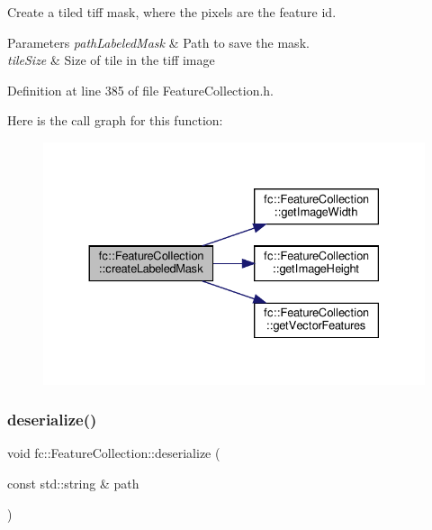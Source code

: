Create a tiled tiff mask, where the pixels are the feature id. 


\begin{DoxyParams}{Parameters}
{\em path\+Labeled\+Mask} & Path to save the mask. \\
\hline
{\em tile\+Size} & Size of tile in the tiff image \\
\hline
\end{DoxyParams}


Definition at line 385 of file Feature\+Collection.\+h.

Here is the call graph for this function\+:
\nopagebreak
\begin{figure}[H]
\begin{center}
\leavevmode
\includegraphics[width=330pt]{d9/d78/classfc_1_1FeatureCollection_a42a98939246d7ca645dafa6694b1aaa3_cgraph}
\end{center}
\end{figure}
\mbox{\label{classfc_1_1FeatureCollection_aad397b4427b4c8805e3330cda59330ef}} 
\subsubsection{\texorpdfstring{deserialize()}{deserialize()}}
{\footnotesize\ttfamily void fc\+::\+Feature\+Collection\+::deserialize (\begin{DoxyParamCaption}\item[{const std\+::string \&}]{path }\end{DoxyParamCaption})\hspace{0.3cm}{\ttfamily [inline]}}



